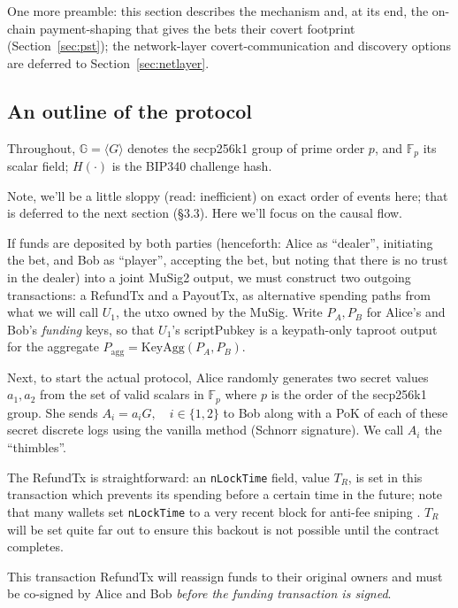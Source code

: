 \documentclass[11pt]{article}
\begin{document}
One more preamble: this section describes the mechanism and, at its end, the on-chain payment-shaping that gives the bets their covert footprint (Section~\ref{sec:pst}); the network-layer covert-communication and discovery options are deferred to Section~\ref{sec:netlayer}.

\subsection{An outline of the protocol}

Throughout, $\mathbb{G}=\langle G\rangle$ denotes the secp256k1 group of prime order $p$, and $\mathbb{F}_p$ its scalar field; $H(\cdot)$ is the BIP340 challenge hash.

Note, we'll be a little sloppy (read: inefficient) on exact order of events here; that is deferred to the next section (\S3.3). Here we'll focus on the causal flow.

If funds are deposited by both parties (henceforth: Alice as ``dealer'', initiating the bet, and Bob as ``player'', accepting the bet, but noting that there is no trust in the dealer) into a joint MuSig2 \cite{musig2,bip327} output, we must construct two outgoing transactions: a RefundTx and a PayoutTx, as alternative spending paths from what we will call $U_1$, the utxo owned by the MuSig. Write $P_A,P_B$ for Alice's and Bob's \emph{funding} keys, so that $U_1$'s scriptPubkey is a keypath-only taproot output for the aggregate $P_{\mathrm{agg}}=\mathrm{KeyAgg}(P_A,P_B)$.

Next, to start the actual protocol, Alice randomly generates two secret values $a_1, a_2$ from the set of valid scalars in $\mathbb{F}_p$ where $p$ is the order of the secp256k1 group. She sends $A_i = a_i G,\quad i \in \{1,2\}$ to Bob along with a PoK of each of these secret discrete logs using the vanilla method (Schnorr signature). We call $A_i$ the ``thimbles''.

The RefundTx is straightforward: an \texttt{nLockTime} field, value $T_R$, is set in this transaction which prevents its spending before a certain time in the future; note that many wallets set \texttt{nLockTime} to a very recent block for anti-fee sniping \cite{antifeesniping}. $T_R$ will be set quite far out to ensure this backout is not possible until the contract completes.

This transaction RefundTx will reassign funds to their original owners and must be co-signed by Alice and Bob \emph{before the funding transaction is signed}.
\end{document}
